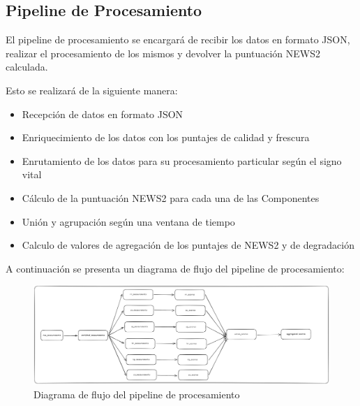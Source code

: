 \subsection{Pipeline de Procesamiento}
El pipeline de procesamiento se encargará de recibir los datos en formato JSON,
realizar el procesamiento de los mismos y devolver la puntuación NEWS2 calculada.

Esto se realizará de la siguiente manera:
\begin{itemize}
    \item Recepción de datos en formato JSON
    \item Enriquecimiento de los datos con los puntajes de calidad y frescura
    \item Enrutamiento de los datos para su procesamiento particular según el signo vital
    \item Cálculo de la puntuación NEWS2 para cada una de las Componentes
    \item Unión y agrupación según una ventana de tiempo
    \item Calculo de valores de agregación de los puntajes de NEWS2 y de degradación
\end{itemize}

A continuación se presenta un diagrama de flujo del pipeline de procesamiento:
\begin{figure}[h]
    \centering
    \includegraphics[width=1\textwidth]{desarrollo/pipeline.png}
    \caption{Diagrama de flujo del pipeline de procesamiento}
    \label{fig:flowchart}
\end{figure}